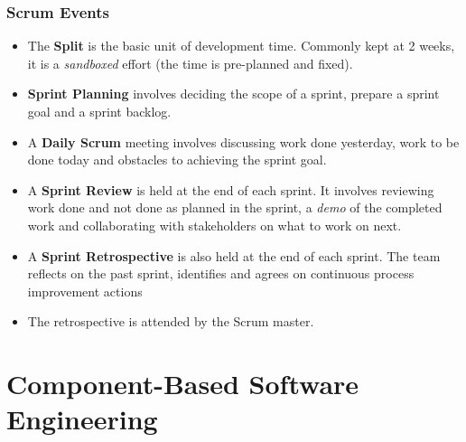 \documentclass{article}
\begin{document}
\subsubsection{Scrum Events}
\begin{itemize}
    \item The \textbf{Split} is the basic unit of development time. Commonly kept at 2 weeks, it is a \textit{sandboxed} effort (the time is pre-planned and fixed).
    
    \item \textbf{Sprint Planning} involves deciding the scope of a sprint, prepare a sprint goal and a sprint backlog. 
    
    \item A \textbf{Daily Scrum} meeting involves discussing work done yesterday, work to be done today and obstacles to achieving the sprint goal. 
    
    \item A \textbf{Sprint Review} is held at the end of each sprint. It involves reviewing work done and not done as planned in the sprint, a \textit{demo} of the completed work and collaborating with stakeholders on what to work on next. 
    
    \item A \textbf{Sprint Retrospective} is also held at the end of each sprint. The team reflects on the past sprint, identifies and agrees on continuous process improvement actions
    
    \item The retrospective is attended by the Scrum master.
\end{itemize}

\section{Component-Based Software Engineering}
\end{document}

